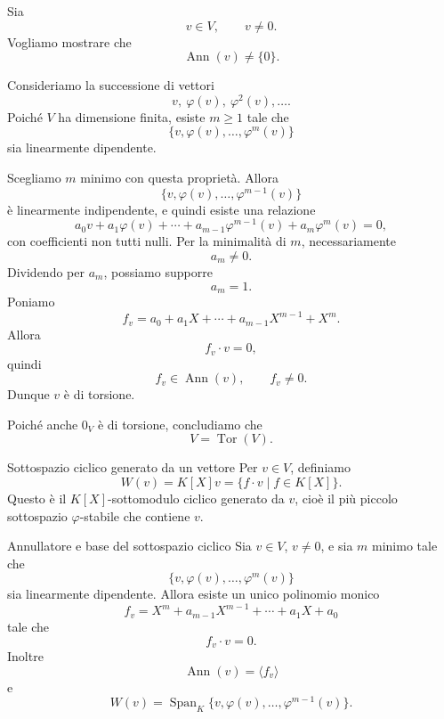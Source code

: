 \documentclass[a4paper]{article}
\begin{document}
\begin{radioactive}
\begin{snippetproof}{}
    Sia
    \[
        v\in V,
        \qquad
        v\neq 0.
    \]
    Vogliamo mostrare che
    \[
        \operatorname{Ann}(v)\neq \{0\}.
    \]

    Consideriamo la successione di vettori
    \[
        v,\ \varphi(v),\ \varphi^2(v),\ldots.
    \]
    Poiché \(V\) ha dimensione finita, esiste \(m\geq 1\) tale che
    \[
        \{v,\varphi(v),\ldots,\varphi^m(v)\}
    \]
    sia linearmente dipendente.

    Scegliamo \(m\) minimo con questa proprietà. Allora
    \[
        \{v,\varphi(v),\ldots,\varphi^{m-1}(v)\}
    \]
    è linearmente indipendente, e quindi esiste una relazione
    \[
        a_0v+a_1\varphi(v)+\cdots+a_{m-1}\varphi^{m-1}(v)+a_m\varphi^m(v)=0,
    \]
    con coefficienti non tutti nulli.
    Per la minimalità di \(m\), necessariamente
    \[
        a_m\neq 0.
    \]
    Dividendo per \(a_m\), possiamo supporre
    \[
        a_m=1.
    \]
    Poniamo
    \[
        f_v
        =
        a_0+a_1X+\cdots+a_{m-1}X^{m-1}+X^m.
    \]
    Allora
    \[
        f_v\cdot v=0,
    \]
    quindi
    \[
        f_v\in\operatorname{Ann}(v),
        \qquad
        f_v\neq 0.
    \]
    Dunque \(v\) è di torsione.

    Poiché anche \(0_V\) è di torsione, concludiamo che
    \[
        V=\operatorname{Tor}(V).
    \]
\end{snippetproof}
\end{radioactive}

\begin{radioactive}
\begin{snippetdefinition}{Sottospazio ciclico generato da un vettore}
    Per \(v\in V\), definiamo
    \[
        W(v)=K[X]v
        =
        \{f\cdot v\mid f\in K[X]\}.
    \]
    Questo è il \(K[X]\)-sottomodulo ciclico generato da \(v\), cioè il più piccolo sottospazio \(\varphi\)-stabile che contiene \(v\).
\end{snippetdefinition}
\end{radioactive}

\begin{radioactive}
\begin{snippetproposition}{Annullatore e base del sottospazio ciclico}
    Sia \(v\in V\), \(v\neq 0\), e sia \(m\) minimo tale che
    \[
        \{v,\varphi(v),\ldots,\varphi^m(v)\}
    \]
    sia linearmente dipendente.
    Allora esiste un unico polinomio monico
    \[
        f_v=X^m+a_{m-1}X^{m-1}+\cdots+a_1X+a_0
    \]
    tale che
    \[
        f_v\cdot v=0.
    \]
    Inoltre
    \[
        \operatorname{Ann}(v)=\langle f_v \rangle
    \]
    e
    \[
        W(v)=\operatorname{Span}_K\{v,\varphi(v),\ldots,\varphi^{m-1}(v)\}.
    \]
\end{snippetproposition}
\end{radioactive}
\end{document}
